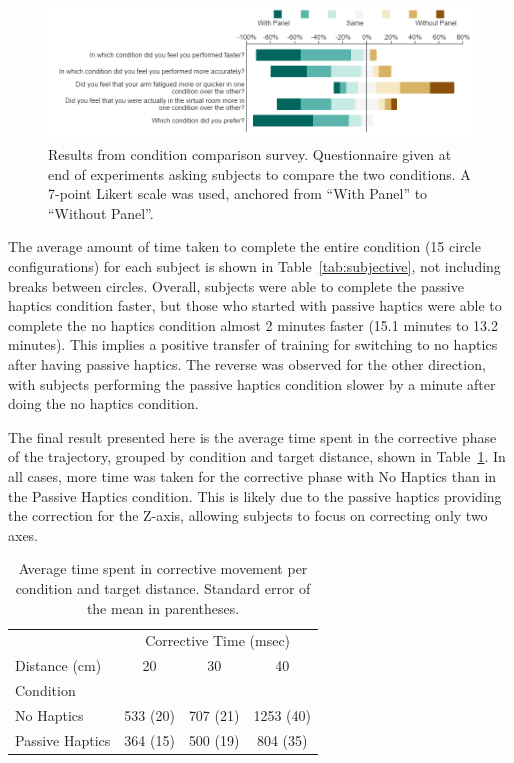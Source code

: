 \documentclass[]{aiaa-tc}%
\begin{document}
\begin{figure}[htb]
  \centering
  \includegraphics{figures/subjective.png}
  \caption{Results from condition comparison survey. Questionnaire given at end of experiments asking subjects to compare the two conditions. A 7-point Likert scale was used, anchored from ``With Panel'' to ``Without Panel''.}
  \label{fig:comparison}
\end{figure}

The average amount of time taken to complete the entire condition (15 circle configurations) for each subject is shown in Table~\ref{tab:subjective}, not including breaks between circles.
Overall, subjects were able to complete the passive haptics condition faster, but those who started with passive haptics were able to complete the no haptics condition almost 2 minutes faster (15.1 minutes to 13.2 minutes).
This implies a positive transfer of training for switching to no haptics after having passive haptics.
The reverse was observed for the other direction, with subjects performing the passive haptics condition slower by a minute after doing the no haptics condition.

The final result presented here is the average time spent in the corrective phase of the trajectory, grouped by condition and target distance, shown in Table~\ref{tab:corrective_time}.
In all cases, more time was taken for the corrective phase with No Haptics than in the Passive Haptics condition.
This is likely due to the passive haptics providing the correction for the Z-axis, allowing subjects to focus on correcting only two axes.

\begin{table}
  \centering
  \begin{tabular}{lccc}
    & \multicolumn{3}{c}{Corrective Time (msec)} \\
    Distance (cm) & 20 & 30 & 40 \\
    Condition & & & \\
    \hline\hline
    No Haptics &  533 (20) & 707 (21) & 1253 (40) \\
    Passive Haptics & 364 (15) & 500 (19) & 804 (35) \\
  \end{tabular}
  \caption{Average time spent in corrective movement per condition and target distance. Standard error of the mean in parentheses.}
  \label{tab:corrective_time}
\end{table}
\end{document}
